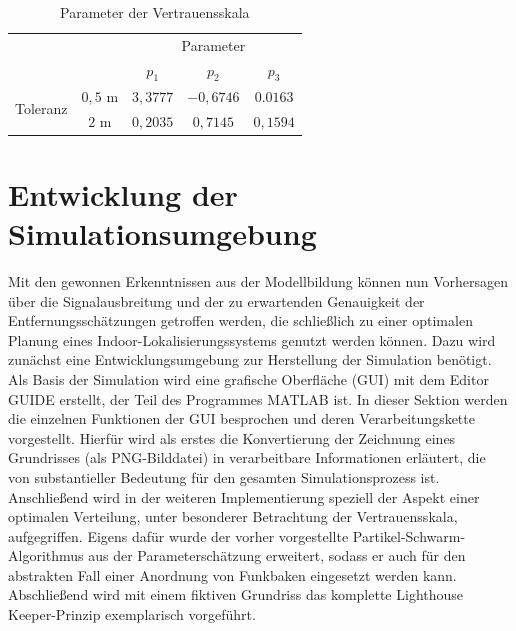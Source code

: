 \begin{table}[H]
\begin{center}
\begin{tabular}{|c|c|c|c|c|}
\cline{3-5}
\multicolumn{2}{c|}{} & \multicolumn{3}{c|}{Parameter} \\
\cline{3-5}
\multicolumn{2}{c|}{} & $p_1$ & $p_2$ & $p_3$ \\
\hline
\multirow{2}{*}{Toleranz} & $0,5$ m & $3,3777$ & $-0,6746$ & $0.0163$\\
\cline{2-5}
& $2$ m & $0,2035$ & $0,7145$ & $0,1594$\\
\hline
\end{tabular}
\end{center}
\caption{Parameter der Vertrauensskala}
\label{tab:ParameterwerteGuete}
\end{table} 
\section{Entwicklung der Simulationsumgebung}
Mit den gewonnen Erkenntnissen aus der Modellbildung können nun Vorhersagen über die Signalausbreitung und der zu erwartenden Genauigkeit der Entfernungsschätzungen getroffen werden, die schließlich zu einer optimalen Planung eines Indoor-Lokalisierungssystems genutzt werden können. Dazu wird zunächst eine Entwicklungsumgebung zur Herstellung der Simulation benötigt. Als Basis der Simulation wird eine grafische Oberfläche (GUI) mit dem Editor GUIDE erstellt, der Teil des Programmes MATLAB \cite{GUIDE} ist. In dieser Sektion werden die einzelnen Funktionen der GUI besprochen und deren Verarbeitungskette vorgestellt. Hierfür wird als erstes die Konvertierung der Zeichnung eines Grundrisses (als PNG-Bilddatei) in verarbeitbare Informationen erläutert, die von substantieller Bedeutung für den gesamten Simulationsprozess ist. Anschließend wird in der weiteren Implementierung speziell der Aspekt einer optimalen Verteilung, unter besonderer Betrachtung der Vertrauensskala, aufgegriffen. Eigens dafür wurde der vorher vorgestellte Partikel-Schwarm-Algorithmus aus der Parameterschätzung erweitert, sodass er auch für den abstrakten Fall einer Anordnung von Funkbaken eingesetzt werden kann. Abschließend wird mit einem fiktiven Grundriss das komplette Lighthouse Keeper-Prinzip exemplarisch vorgeführt.  
